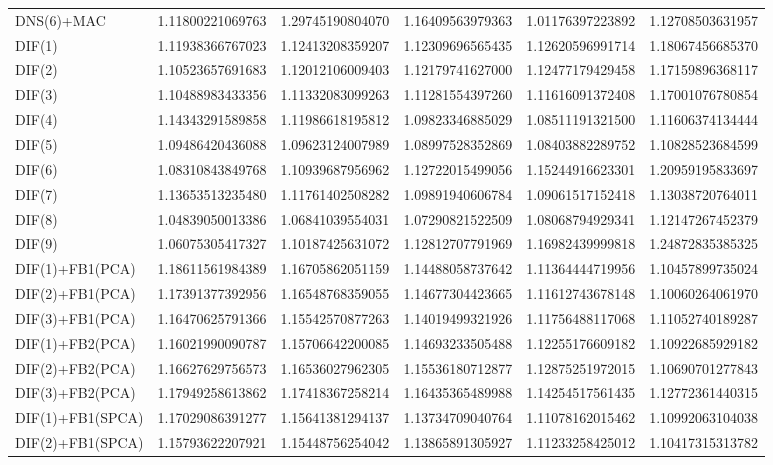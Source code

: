 \begin{table}[H]
\begin{adjustbox}{totalheight=\baselineskip}
\begin{tabular}{lSSSSS}
DNS(6)+MAC & 1.11800221069763 & 1.29745190804070 & 1.16409563979363 & 1.01176397223892 & 1.12708503631957 \\ 
DIF(1) & 1.11938366767023 & 1.12413208359207 & 1.12309696565435 & 1.12620596991714 & 1.18067456685370 \\ 
DIF(2) & 1.10523657691683 & 1.12012106009403 & 1.12179741627000 & 1.12477179429458 & 1.17159896368117 \\ 
DIF(3) & 1.10488983433356 & 1.11332083099263 & 1.11281554397260 & 1.11616091372408 & 1.17001076780854 \\ 
DIF(4) & 1.14343291589858 & 1.11986618195812 & 1.09823346885029 & 1.08511191321500 & 1.11606374134444 \\ 
DIF(5) & 1.09486420436088 & 1.09623124007989 & 1.08997528352869 & 1.08403882289752 & 1.10828523684599 \\ 
DIF(6) & 1.08310843849768 & 1.10939687956962 & 1.12722015499056 & 1.15244916623301 & 1.20959195833697 \\ 
DIF(7) & 1.13653513235480 & 1.11761402508282 & 1.09891940606784 & 1.09061517152418 & 1.13038720764011 \\ 
DIF(8) & 1.04839050013386 & 1.06841039554031 & 1.07290821522509 & 1.08068794929341 & 1.12147267452379 \\ 
DIF(9) & 1.06075305417327 & 1.10187425631072 & 1.12812707791969 & 1.16982439999818 & 1.24872835385325 \\ 
DIF(1)+FB1(PCA) & 1.18611561984389 & 1.16705862051159 & 1.14488058737642 & 1.11364444719956 & 1.10457899735024 \\ 
DIF(2)+FB1(PCA) & 1.17391377392956 & 1.16548768359055 & 1.14677304423665 & 1.11612743678148 & 1.10060264061970 \\ 
DIF(3)+FB1(PCA) & 1.16470625791366 & 1.15542570877263 & 1.14019499321926 & 1.11756488117068 & 1.11052740189287 \\ 
DIF(1)+FB2(PCA) & 1.16021990090787 & 1.15706642200085 & 1.14693233505488 & 1.12255176609182 & 1.10922685929182 \\ 
DIF(2)+FB2(PCA) & 1.16627629756573 & 1.16536027962305 & 1.15536180712877 & 1.12875251972015 & 1.10690701277843 \\ 
DIF(3)+FB2(PCA) & 1.17949258613862 & 1.17418367258214 & 1.16435365489988 & 1.14254517561435 & 1.12772361440315 \\ 
DIF(1)+FB1(SPCA) & 1.17029086391277 & 1.15641381294137 & 1.13734709040764 & 1.11078162015462 & 1.10992063104038 \\ 
DIF(2)+FB1(SPCA) & 1.15793622207921 & 1.15448756254042 & 1.13865891305927 & 1.11233258425012 & 1.10417315313782 \\ 

\end{tabular}
\end{adjustbox}
\end{table}
